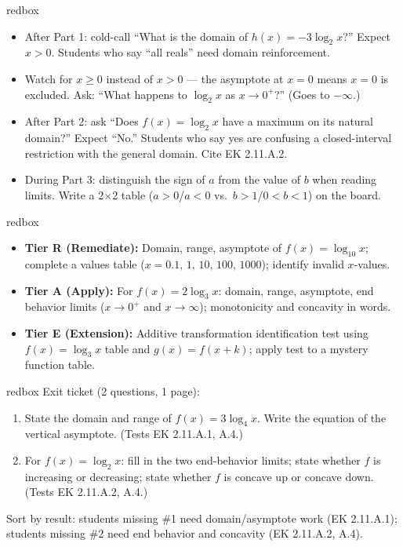 \documentclass[10pt]{article}
\begin{document}
\begin{skillbox}{redbox}
\begin{itemize}[leftmargin=1.2em,itemsep=2pt,topsep=0pt]
  \item After Part 1: cold-call ``What is the domain of $h(x) = -3\log_2 x$?'' Expect $x > 0$.
        Students who say ``all reals'' need domain reinforcement.
  \item Watch for $x \ge 0$ instead of $x > 0$ --- the asymptote at $x = 0$ means $x = 0$
        is excluded. Ask: ``What happens to $\log_2 x$ as $x \to 0^+$?'' (Goes to $-\infty$.)
  \item After Part 2: ask ``Does $f(x) = \log_2 x$ have a maximum on its natural domain?''
        Expect ``No.'' Students who say yes are confusing a closed-interval restriction with
        the general domain. Cite EK 2.11.A.2.
  \item During Part 3: distinguish the sign of $a$ from the value of $b$ when reading limits.
        Write a 2$\times$2 table ($a>0$/$a<0$ vs.\ $b>1$/$0<b<1$) on the board.
\end{itemize}
\end{skillbox}

\begin{skillbox}{redbox}
\begin{itemize}[leftmargin=1.2em,itemsep=2pt,topsep=0pt]
  \item \textbf{Tier R (Remediate):} Domain, range, asymptote of $f(x) = \log_{10} x$;
        complete a values table ($x = 0.1,\,1,\,10,\,100,\,1000$); identify invalid $x$-values.
  \item \textbf{Tier A (Apply):} For $f(x) = 2\log_3 x$: domain, range, asymptote, end
        behavior limits ($x \to 0^+$ and $x \to \infty$); monotonicity and concavity in words.
  \item \textbf{Tier E (Extension):} Additive transformation identification test using
        $f(x) = \log_3 x$ table and $g(x) = f(x+k)$; apply test to a mystery function table.
\end{itemize}
\end{skillbox}

\begin{skillbox}{redbox}
Exit ticket (2 questions, 1 page):
\begin{enumerate}[leftmargin=1.5em,itemsep=2pt,topsep=2pt]
  \item State the domain and range of $f(x) = 3\log_4 x$. Write the equation of the vertical
        asymptote. (Tests EK 2.11.A.1, A.4.)
  \item For $f(x) = \log_2 x$: fill in the two end-behavior limits; state whether $f$ is
        increasing or decreasing; state whether $f$ is concave up or concave down.
        (Tests EK 2.11.A.2, A.4.)
\end{enumerate}

Sort by result: students missing \#1 need domain/asymptote work (EK 2.11.A.1); students
missing \#2 need end behavior and concavity (EK 2.11.A.2, A.4).
\end{skillbox}
\end{document}
